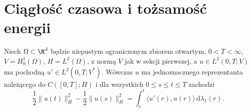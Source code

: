 \section{Ciągłość czasowa i tożsamość energii}
\begin{lemat}\label{lem:pde20-energy}
Niech $\Omega\subset\R^d$ będzie niepustym ograniczonym
zbiorem otwartym, $0<T<\infty$, $V=H_0^1(\Omega)$,
$H=L^2(\Omega)$, z normą $V$ jak w sekcji pierwszej,
a $u\in L^2(0,T;V)$ ma pochodną $u'\in L^2(0,T;V^*)$.
Wówczas $u$ ma jednoznacznego reprezentanta należącego do
$C([0,T];H)$ i dla wszystkich $0\le s\le t\le T$ zachodzi
\begin{equation}\label{eq:pde20-energy-identity}
 \frac12\|u(t)\|_H^2-\frac12\|u(s)\|_H^2
 =\int_s^t\langle u'(r),u(r)\rangle\,\mathrm d\lambda_1(r).
\end{equation}
\end{lemat}
